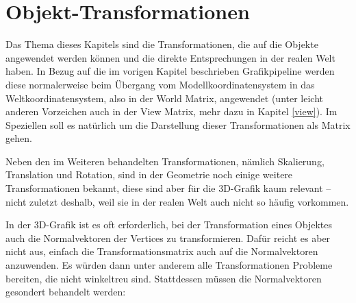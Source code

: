 \chapter{Objekt-Transformationen}
\label{3d-transformations}

Das Thema dieses Kapitels sind die Transformationen, die auf die Objekte angewendet werden können und die direkte Entsprechungen in der realen Welt haben. In Bezug auf die im vorigen Kapitel beschrieben Grafikpipeline werden diese normalerweise beim Übergang vom Modellkoordinatensystem in das Weltkoordinatensystem, also in der World Matrix, angewendet (unter leicht anderen Vorzeichen auch in der View Matrix, mehr dazu in Kapitel \ref{view}). Im Speziellen soll es natürlich um die Darstellung dieser Transformationen als Matrix gehen.

Neben den im Weiteren behandelten Transformationen, nämlich Skalierung, Translation und Rotation, sind in der Geometrie noch einige weitere Transformationen bekannt, diese sind aber für die 3D-Grafik kaum relevant -- nicht zuletzt deshalb, weil sie in der realen Welt auch nicht so häufig vorkommen.

In der 3D-Grafik ist es oft erforderlich, bei der Transformation eines Objektes auch die Normalvektoren der Vertices zu transformieren. Dafür reicht es aber nicht aus, einfach die Transformationsmatrix auch auf die Normalvektoren anzuwenden. Es würden dann unter anderem alle Transformationen Probleme bereiten, die nicht winkeltreu sind. Stattdessen müssen die Normalvektoren gesondert behandelt werden:


